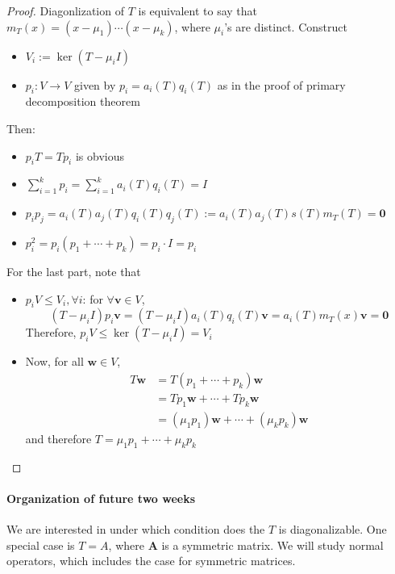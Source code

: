 \begin{proof}
Diagonlization of $T$ is equivalent to say that $m_T(x) = (x-\mu_1)\cdots(x-\mu_k)$, where $\mu_i$'s are distinct.
Construct
\begin{itemize}
\item
$V_i:=\ker(T-\mu_iI)$
\item
$p_i:V\to V$ given by $p_i=a_i(T)q_i(T)$ as in the proof of primary decomposition theorem
\end{itemize}
Then:
\begin{itemize}
\item
$p_iT=Tp_i$ is obvious
\item
$\sum_{i=1}^kp_i=\sum_{i=1}^ka_i(T)q_i(T)=I$
\item
$p_ip_j = a_i(T)a_j(T)q_i(T)q_j(T):=a_i(T)a_j(T)s(T)m_T(T)=\bm0$
\item
$p_i^2 = p_i(p_1+\cdots+p_k) = p_i\cdot I=p_i$
\end{itemize}

For the last part, note that 
\begin{itemize}
\item
$p_iV\le V_i,\forall i$: 
for $\forall\bm v\in V$,
\[
(T-\mu_iI)p_i\bm v=(T-\mu_iI)a_i(T)q_i(T)\bm v
=
a_i(T)m_T(x)\bm v=\bm0
\]
Therefore, $p_iV\le\ker(T-\mu_i I)=V_i$
\item
Now, for all $\bm w\in V$, 
\begin{align*}
T\bm w&=T(p_1+\cdots+p_k)\bm w\\
&=Tp_1\bm w+\cdots+Tp_k\bm w\\
&=(\mu_1p_1)\bm w+\cdots+(\mu_kp_k)\bm w
\end{align*}
and therefore $T = \mu_1p_1+\cdots+\mu_kp_k$
\end{itemize}
\end{proof}

\paragraph{Organization of future two weeks}
We are interested in under which condition does the $T$ is diagonalizable.
One special case is $T=A$, where $\bm A$ is a symmetric matrix.
We will study normal operators, which includes the case for symmetric matrices.

